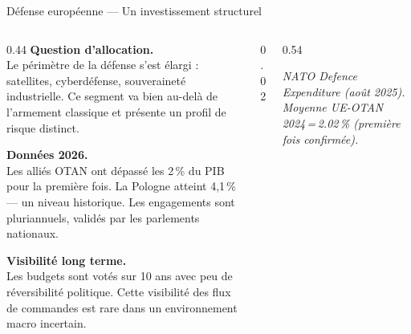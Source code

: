 \documentclass[aspectratio=169,9pt]{beamer}
\newcommand{\src}[1]{{\vspace{2pt}\par\raggedright\tiny\color{steel}\itshape #1}}
\newcommand{\er}{{\textcolor{navy}{\rule{16pt}{2.5pt}}}\enspace}
\newcommand{\kw}[1]{{\color{navy}\footnotesize\bfseries #1}\\[3pt]}
\begin{document}
\begin{frame}{Défense européenne — Un investissement structurel}
\begin{columns}[T,totalwidth=\textwidth]

\begin{column}{0.44\textwidth}
\kw{Question d'allocation.}
{\small Le périmètre de la défense s'est élargi : satellites, cyberdéfense,
souveraineté industrielle. Ce segment va bien au-delà de l'armement classique
et présente un profil de risque distinct.}

\vspace{5pt}
\kw{Données 2026.}
{\small Les alliés OTAN ont dépassé les 2\,\% du PIB pour la première fois.
La Pologne atteint 4,1\,\% — un niveau historique. Les engagements sont
pluriannuels, validés par les parlements nationaux.}

\vspace{5pt}
\kw{Visibilité long terme.}
{\small Les budgets sont votés sur 10 ans avec peu de réversibilité
politique. Cette visibilité des flux de commandes est rare dans
un environnement macro incertain.}
\end{column}

\begin{column}{0.02\textwidth}\end{column}

\begin{column}{0.54\textwidth}
\src{NATO Defence Expenditure (août 2025). Moyenne UE-OTAN 2024\,=\,2.02\,\% (première fois confirmée).}
\end{column}

\end{columns}
\end{frame}
\end{document}
